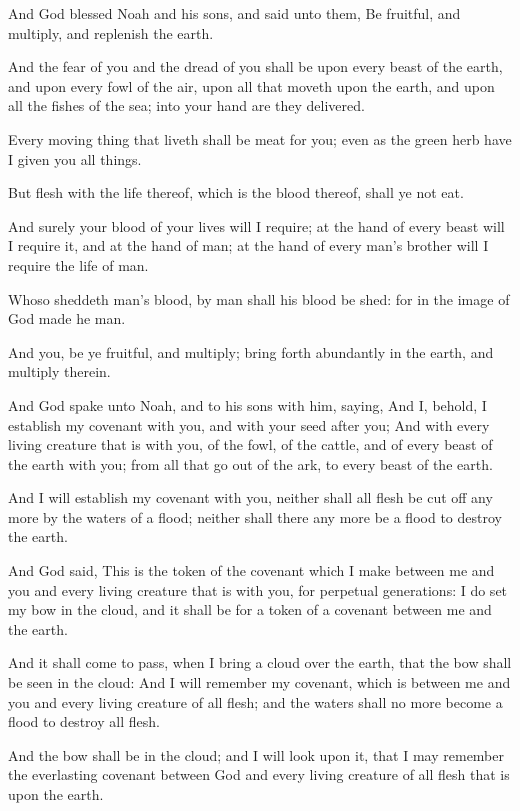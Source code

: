 \Chapter
\Verse And God blessed Noah and his sons, and said unto them, Be fruitful, and multiply, and replenish the earth.

\Verse And the fear of you and the dread of you shall be upon every beast of the earth, and upon every fowl of the air, upon all that moveth upon the earth, and upon all the fishes of the sea; into your hand are they delivered.

\Verse Every moving thing that liveth shall be meat for you; even as the green herb have I given you all things.

\Verse But flesh with the life thereof, which is the blood thereof, shall ye not eat.

\Verse And surely your blood of your lives will I require; at the hand of every beast will I require it, and at the hand of man; at the hand of every man's brother will I require the life of man.

\Verse Whoso sheddeth man's blood, by man shall his blood be shed: for in the image of God made he man.

\Verse And you, be ye fruitful, and multiply; bring forth abundantly in the earth, and multiply therein.

\Verse And God spake unto Noah, and to his sons with him, saying, \Verse And I, behold, I establish my covenant with you, and with your seed after you; \Verse And with every living creature that is with you, of the fowl, of the cattle, and of every beast of the earth with you; from all that go out of the ark, to every beast of the earth.

\Verse And I will establish my covenant with you, neither shall all flesh be cut off any more by the waters of a flood; neither shall there any more be a flood to destroy the earth.

\Verse And God said, This is the token of the covenant which I make between me and you and every living creature that is with you, for perpetual generations: \Verse I do set my bow in the cloud, and it shall be for a token of a covenant between me and the earth.

\Verse And it shall come to pass, when I bring a cloud over the earth, that the bow shall be seen in the cloud: \Verse And I will remember my covenant, which is between me and you and every living creature of all flesh; and the waters shall no more become a flood to destroy all flesh.

\Verse And the bow shall be in the cloud; and I will look upon it, that I may remember the everlasting covenant between God and every living creature of all flesh that is upon the earth.

